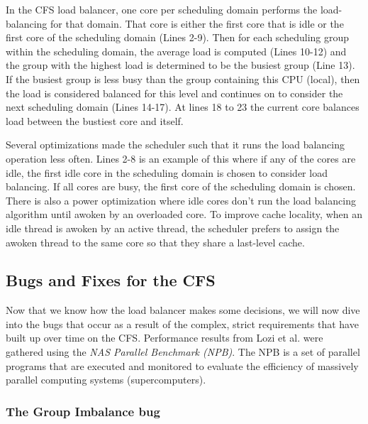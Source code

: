 \documentclass{sig-alternate}
\begin{document}
In the CFS load balancer, one core per scheduling domain performs the load-balancing for that domain. That core is either the first core that is idle or the first core of the scheduling domain (Lines 2-9). Then for each scheduling group within the scheduling domain, the average load is computed (Lines 10-12) and the group with the highest load is determined to be the busiest group (Line 13). If the busiest group is less busy than the group containing this CPU (local), then the load is considered balanced for this level and continues on to consider the next scheduling domain (Lines 14-17). At lines 18 to 23 the current core balances load between the bustiest core and itself.~\cite{Lozi:2016}

Several optimizations made the scheduler such that it runs the load balancing operation less often. Lines 2-8 is an example of this where if any of the cores are idle, the first idle core in the scheduling domain is chosen to consider load balancing. If all cores are busy, the first core of the scheduling domain is chosen. There is also a power optimization where idle cores don't run the load balancing algorithm until awoken by an overloaded core. To improve cache locality, when an idle thread is awoken by an active thread, the scheduler prefers to assign the awoken thread to the same core so that they share a last-level cache.~\cite{Lozi:2016}

\subsection{Bugs and Fixes for the CFS}
\label{sec:cfsbugs}

Now that we know how the load balancer makes some decisions, we will now dive into the bugs that occur as a result of the complex, strict requirements that have built up over time on the CFS. Performance results from Lozi et al. were gathered using the \emph{NAS Parallel Benchmark (NPB)}. The NPB is a set of parallel programs that are executed and monitored to evaluate the efficiency of massively parallel computing systems (supercomputers).

\subsubsection{The Group Imbalance bug}
\label{sec:cfsfault_grpimbalance}
\end{document}

